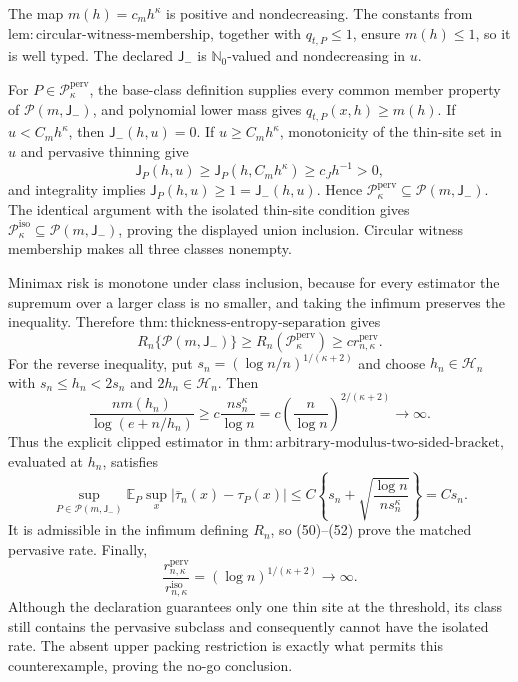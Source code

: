 The map \(m(h)=c_mh^\kappa\) is positive and nondecreasing.  The constants from \(\mathrm{lem:circular\text{-}witness\text{-}membership}\), together with \(q_{t,P}\le1\), ensure \(m(h)\le1\), so it is well typed.  The declared \(\mathsf J_-\) is \(\mathbb N_0\)-valued and nondecreasing in \(u\).

For \(P\in\mathcal P_\kappa^{\mathrm{perv}}\), the base-class definition supplies every common member property of \(\mathcal P(m,\mathsf J_-)\), and polynomial lower mass gives \(q_{t,P}(x,h)\ge m(h)\).  If \(u<C_mh^\kappa\), then \(\mathsf J_-(h,u)=0\).  If \(u\ge C_mh^\kappa\), monotonicity of the thin-site set in \(u\) and pervasive thinning give
\[
 \mathsf J_P(h,u)\ge\mathsf J_P(h,C_mh^\kappa)\ge c_Jh^{-1}>0,
\]
and integrality implies \(\mathsf J_P(h,u)\ge1=\mathsf J_-(h,u)\).  Hence \(\mathcal P_\kappa^{\mathrm{perv}}\subseteq\mathcal P(m,\mathsf J_-)\).  The identical argument with the isolated thin-site condition gives \(\mathcal P_\kappa^{\mathrm{iso}}\subseteq\mathcal P(m,\mathsf J_-)\), proving the displayed union inclusion.  Circular witness membership makes all three classes nonempty.

Minimax risk is monotone under class inclusion, because for every estimator the supremum over a larger class is no smaller, and taking the infimum preserves the inequality.  Therefore \(\mathrm{thm:thickness\text{-}entropy\text{-}separation}\) gives
\[
 R_n\{\mathcal P(m,\mathsf J_-)\}\ge R_n(\mathcal P_\kappa^{\mathrm{perv}})
 \ge c r_{n,\kappa}^{\mathrm{perv}}. \tag{50}
\]
For the reverse inequality, put \(s_n=(\log n/n)^{1/(\kappa+2)}\) and choose \(h_n\in\mathcal H_n\) with \(s_n\le h_n<2s_n\) and \(2h_n\in\mathcal H_n\).  Then
\[
 \frac{nm(h_n)}{\log(e+n/h_n)}
 \ge c\frac{ns_n^\kappa}{\log n}
 =c\left(\frac n{\log n}\right)^{2/(\kappa+2)}\longrightarrow\infty. \tag{51}
\]
Thus the explicit clipped estimator in \(\mathrm{thm:arbitrary\text{-}modulus\text{-}two\text{-}sided\text{-}bracket}\), evaluated at \(h_n\), satisfies
\[
 \sup_{P\in\mathcal P(m,\mathsf J_-)}\mathbb E_P\sup_x|\overline\tau_n(x)-\tau_P(x)|
 \le C\left\{s_n+\sqrt{\frac{\log n}{ns_n^\kappa}}\right\}=Cs_n. \tag{52}
\]
It is admissible in the infimum defining \(R_n\), so (50)--(52) prove the matched pervasive rate.  Finally,
\[
 \frac{r_{n,\kappa}^{\mathrm{perv}}}{r_{n,\kappa}^{\mathrm{iso}}}
 =(\log n)^{1/(\kappa+2)}\longrightarrow\infty.
\]
Although the declaration guarantees only one thin site at the threshold, its class still contains the pervasive subclass and consequently cannot have the isolated rate.  The absent upper packing restriction is exactly what permits this counterexample, proving the no-go conclusion.